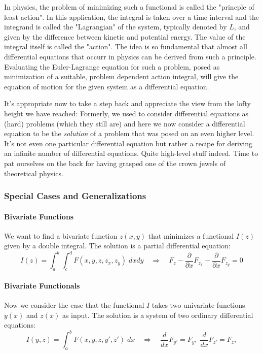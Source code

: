 \medskip
In physics, the problem of minimizing such a functional is called the "princple of least action". In this application, the integral is taken over a time interval and the integrand is called the "Lagrangian" of the system, typically denoted by $L$, and given by the difference between kinetic and potential energy. The value of the integral itself is called the "action". The idea is so fundamental that almost all differential equations that occurr in physics can be derived from such a principle. Evaluating the Euler-Lagrange equation for such a problem, posed as minimization of a suitable, problem dependent action integral, will give the equation of motion for the given system as a differential equation.

\medskip
It's appropriate now to take a step back and appreciate the view from the lofty height we have reached:  Formerly, we used to consider differential equations as (hard) problems (which they still are) and here we now consider a differential equation to be the \emph{solution} of a problem that was posed on an even higher level. It's not even one particular differential equation but rather a recipe for deriving an infinite number of differential equations. Quite high-level stuff indeed. Time to pat ourselves on the back for having grasped one of the crown jewels of theoretical physics. 


\subsubsection{Special Cases and Generalizations}


\paragraph{Bivariate Functions} We want to find a bivariate function $z(x,y)$ that minimizes a functional $I(z)$ given by a double integral. The solution is a partial differential equation:
\begin{equation}
 I(z) = \int_a^b \int_c^d  F(x,y,z,z_x,z_y ) \; dx dy
 \quad \Rightarrow \quad
  F_z - \frac{\partial}{\partial x} F_{z_x} - \frac{\partial}{\partial x} F_{z_y} = 0
\end{equation}

\paragraph{Bivariate Functionals} Now we consider the case that the functional $I$ takes two univariate functions $y(x)$ and $z(x)$ as input. The solution is a system of two ordinary differential equations:
\begin{equation}
 I(y,z) = \int_a^b F(x,y,z,y',z' ) \; dx
 \quad \Rightarrow \quad
 \frac{d}{d x} F_{y'} = F_y, \;  \frac{d}{d x} F_{z'} = F_z,
\end{equation}

